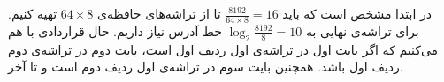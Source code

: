 در ابتدا مشخص است که باید
$\frac{8192}{64 \times 8} = 16$
تا از تراشه‌های حافظه‌ی
$64 \times 8$
تهیه کنیم.
برای تراشه‌ی نهایی به
$\log_2 \frac{8192}{8} = 10$
خط آدرس نیاز داریم.
حال قراردادی با هم می‌کنیم که اگر بایت اول در تراشه‌ی اول ردیف اول است، بایت دوم در تراشه‌ی دوم ردیف اول باشد.
همچنین بایت سوم در تراشه‌ی اول ردیف دوم است و تا آخر.
\\